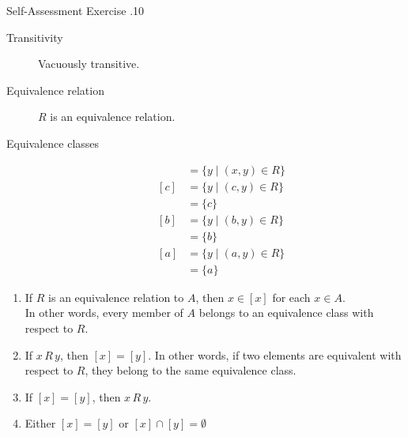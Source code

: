 \documentclass[../notes.tex]{subfiles}
\begin{document}
\begin{exercise}{Self-Assessment Exercise \thechapter.10}
\begin{enumerate}
\begin{enumerate}[label=(\alph*)]
\begin{description}
										\item[Transitivity] Vacuously transitive.
										\item[Equivalence relation] $R$ is an equivalence relation.
										\item[Equivalence classes]
											\begin{align*}
												[x] &= \{y \mid (x, y) \in R\}\\
												[c] &= \{y \mid (c, y) \in R\}\\
												&= \{c\}\\
												[b] &= \{y \mid (b, y) \in R\}\\
												&= \{b\}\\
												[a] &= \{y \mid (a, y) \in R\}\\
												&= \{a\}
											\end{align*}    
									\end{description}
							\end{enumerate}
					\end{enumerate}
				\end{exercise}
				\pagebreak
				\begin{theorem}
					\begin{enumerate}[label=(\roman*)]
						\item If $R$ is an equivalence relation to $A$, then $x \in [x]$ for each $x \in A$.\\
							In other words, every member of $A$ belongs to an equivalence class with respect to $R$.
						\item If $x\, R \, y$, then $[x] = [y]$. In other words, if two elements are equivalent with respect to $R$, they belong to the same equivalence class.
						\item If $[x] = [y]$, then $x \, R \, y$.
						\item Either $[x] = [y]$ or $[x] \cap [y] = \emptyset$
					\end{enumerate}
				\end{theorem}
\end{document}
